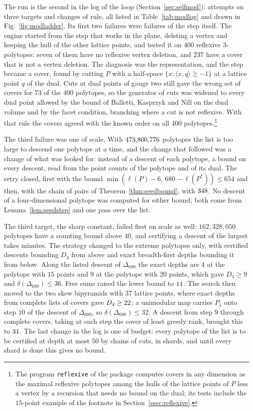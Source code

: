 The run is the second in the log of the loop (Section~\ref{sec:selfmod}): \modSeedAttempts{} attempts on three targets and \modSeedChanges{} changes of rule, all listed in Table~\ref{tab:modlog} and drawn in Fig.~\ref{fig:modladder}. Its first two failures were failures of the step itself. The engine started from the step that works in the plane, deleting a vertex and keeping the hull of the other lattice points, and tested it on $400$ reflexive $3$-polytopes: seven of them have no reflexive vertex deletion, and $237$ have a cover that is not a vertex deletion. The diagnosis was the representation, and the step became a cover, found by cutting $P$ with a half-space $\{x:\langle x,q\rangle\ge-1\}$ at a lattice point $q$ of the dual. Cuts at dual points of gauge two still gave the wrong set of covers for $73$ of the $400$ polytopes, so the generator of cuts was widened to every dual point allowed by the bound of Balletti, Kasprzyk and Nill on the dual volume \cite{BKN22} and by the facet condition, branching where a cut is not reflexive. With that rule the covers agreed with the known order on all $400$ polytopes.\footnote{The program \texttt{reflexive} of the package computes covers in any dimension as the maximal reflexive polytopes among the hulls of the lattice points of $P$ less a vertex by a recursion that needs no bound on the dual; its tests include the $15$-point example of the footnote in Section~\ref{ssec:reflexive}.}

The third failure was one of scale. With $473{,}800{,}776$ polytopes the list is too large to descend one polytope at a time, and the change that followed was a change of what was looked for: instead of a descent of each polytope, a bound on every descent, read from the point counts of the polytope and of its dual. The retry closed, first with the bound $\min(\ell(P)-6,\,680-\ell(P^{*}))\le654$ and then, with the chain of pairs of Theorem~\ref{thm:seedbound}, with $348$. No descent of a four-dimensional polytope was computed for either bound; both come from Lemma~\ref{lem:seedstep} and one pass over the list.

The third target, the sharp constant, failed first on scale as well: $162{,}328{,}050$ polytopes have a counting bound above $40$, and certifying a descent of the largest takes minutes. The strategy changed to the extreme polytopes only, with certified descents bounding $D_{4}$ from above and exact breadth-first depths bounding it from below. Along the listed descent of $\Delta_{680}$ the exact depths are $4$ at the polytope with $15$ points and $9$ at the polytope with $20$ points, which gave $D_{4}\ge9$ and $\delta(\Delta_{680})\le36$. Free sums raised the lower bound to $11$. The search then moved to the two skew bipyramids with $37$ lattice points, where exact depths from complete lists of covers gave $D_{4}\ge22$; a unimodular map carries $P_{1}$ onto step $10$ of the descent of $\Delta_{680}$, so $\delta(\Delta_{680})\le32$. A descent from step $9$ through complete covers, taking at each step the cover of least greedy rank, brought this to $31$. The last change in the log is one of budget: every polytope of the list is to be certified at depth at most $50$ by chains of cuts, in shards, and until every shard is done this gives no bound.

